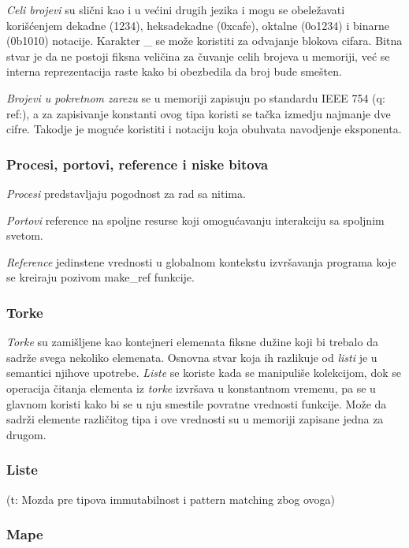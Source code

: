 \documentclass[a4paper]{article}
\begin{document}
\textit{Celi brojevi} su slični kao i u većini drugih jezika i mogu se obeležavati korišćenjem dekadne (1234), heksadekadne (0xcafe), oktalne (0o1234) i binarne (0b1010) notacije. Karakter \_ se može koristiti za odvajanje blokova cifara. Bitna stvar je da ne postoji fiksna veličina za čuvanje celih brojeva u memoriji, već se interna reprezentacija raste kako bi obezbedila da broj bude smešten.

\textit{Brojevi u pokretnom zarezu} se u memoriji zapisuju po standardu IEEE 754 (q: ref:), a za zapisivanje konstanti ovog tipa koristi se tačka izmedju najmanje dve cifre. Takodje je moguće koristiti i notaciju koja obuhvata navodjenje eksponenta.

\subsubsection{Procesi, portovi, reference i niske bitova}
\label{sec:ime}
\textit{Procesi} predstavljaju pogodnost za rad sa nitima.

\textit{Portovi} reference na spoljne resurse koji omogućavanju interakciju sa spoljnim svetom.

\textit{Reference} jedinstene vrednosti u globalnom kontekstu izvršavanja programa koje se kreiraju pozivom make\_ref funkcije.

\subsubsection{Torke}
\label{sec:ime}
\textit{Torke} su zamišljene kao kontejneri elemenata fiksne dužine koji bi trebalo da sadrže svega nekoliko elemenata. Osnovna stvar koja ih razlikuje od \textit{listi} je u semantici njihove upotrebe. \textit{Liste} se koriste kada se manipuliše kolekcijom, dok se operacija čitanja elementa iz \textit{torke} izvršava u konstantnom vremenu, pa se u glavnom koristi kako bi se u nju smestile povratne vrednosti funkcije. Može da sadrži elemente različitog tipa i ove vrednosti su u memoriji zapisane jedna za drugom.

\subsubsection{Liste}
\label{sec:ime}
(t: Mozda pre tipova immutabilnost i pattern matching zbog ovoga)
\subsubsection{Mape}
\label{sec:ime}
\end{document}
